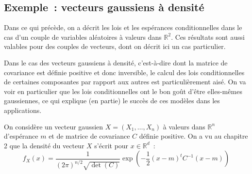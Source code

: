 \subsection*{Exemple~: vecteurs gaussiens à
densité}\label{III-exemple-vecteurs-gaussiens-uxe0-densituxe9}

Dans ce qui précède, on a décrit les lois et les espérances
conditionnelles dans le cas d'un couple de variables aléatoires à
valeurs dans \(\mathbb{R}^2\). Ces résultats sont aussi valables pour
des couples de vecteurs, dont on décrit ici un cas particulier.

Dans le cas des vecteurs gaussiens à densité, c'est-à-dire dont la
matrice de covariance est définie positive et donc inversible, le calcul
des lois conditionnelles de certaines composantes par rapport aux autres
est particulièrement aisé. On va voir en particulier que les lois
conditionnelles ont le bon goût d'être elles-mêmes gaussiennes, ce qui
explique (en partie) le succès de ces modèles dans les applications.

On considère un vecteur gaussien \(X = (X_1,\ldots,X_n)\) à valeurs dans
\(\mathbb{R}^n\) d'espérance \(m\) et de matrice de covariance \(C\)
définie positive. On a vu au chapitre 2 que la densité du vecteur \(X\)
s'écrit pour \(x\in\mathbb{R}^d\)~:
\[f_X(x) = \frac{1}{(2\pi)^{n/2}\sqrt{\det (C)}}\exp \left(-\frac{1}{2}(x-m)^t C^{-1}(x-m)\right)\]

